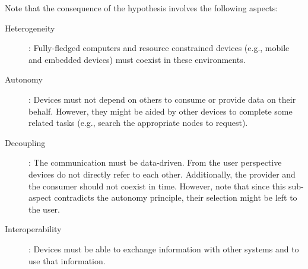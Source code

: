 Note that the consequence of the hypothesis involves the following aspects:
\begin{description}
  \item[Heterogeneity]: Fully-fledged computers and resource constrained devices (e.g., mobile and embedded devices) must coexist in these environments.
  \item[Autonomy]: Devices must not depend on others to consume or provide data on their behalf.
                   However, they might be aided by other devices to complete some related tasks (e.g., search the appropriate nodes to request).
  \item[Decoupling]: The communication must be data-driven.
		    From the user perspective devices do not directly refer to each other.
		    Additionally, the provider and the consumer should not coexist in time.
		    However, note that since this sub-aspect contradicts the autonomy principle, their selection might be left to the user.
  \item[Interoperability]: Devices must be able to exchange information with other systems and to use that information. %
\end{description}